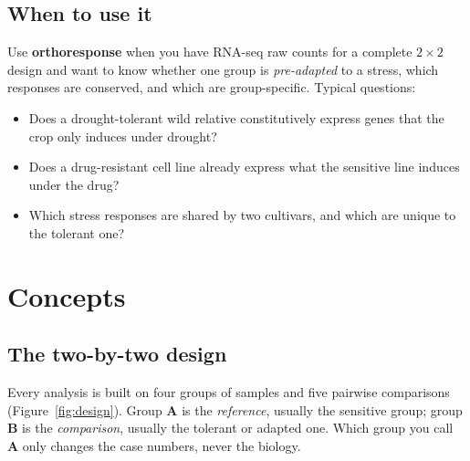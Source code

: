 \documentclass[11pt,a4paper]{article}
\newcommand{\pkg}{\textsf{\bfseries orthoresponse}}
\newcommand{\A}{\textcolor{grpA}{\textbf{A}}}
\newcommand{\B}{\textcolor{grpB}{\textbf{B}}}
\begin{document}
\subsection{When to use it}
Use \pkg{} when you have RNA-seq raw counts for a complete \(2\times2\) design and want to know
whether one group is \emph{pre-adapted} to a stress, which responses are conserved, and which are
group-specific. Typical questions:
\begin{itemize}
  \item Does a drought-tolerant wild relative constitutively express genes that the crop only induces under drought?
  \item Does a drug-resistant cell line already express what the sensitive line induces under the drug?
  \item Which stress responses are shared by two cultivars, and which are unique to the tolerant one?
\end{itemize}

\section{Concepts}

\subsection{The two-by-two design}

Every analysis is built on four groups of samples and five pairwise comparisons
(Figure~\ref{fig:design}). Group \A{} is the \emph{reference}, usually the sensitive group; group
\B{} is the \emph{comparison}, usually the tolerant or adapted one. Which group you call \A{} only
changes the case numbers, never the biology.
\end{document}
